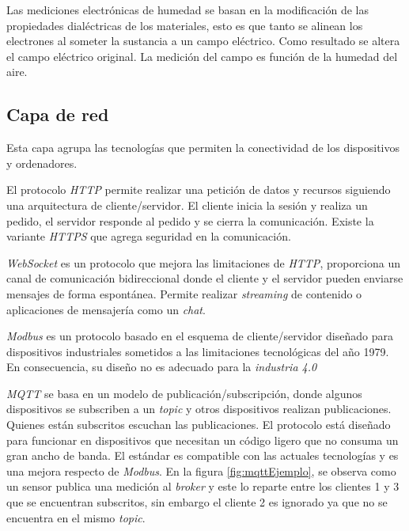			Las mediciones electrónicas de humedad se basan en la modificación de las propiedades dialéctricas de los materiales, esto es que tanto se alinean los electrones al someter la sustancia a un campo eléctrico. Como resultado se altera el campo eléctrico original. La medición del campo es función de la humedad del aire.
		
	\subsection{Capa de red}
	\label{capaRed}
	
		Esta capa agrupa las tecnologías que permiten la conectividad de los dispositivos y ordenadores.
		
		El protocolo \emph{HTTP} permite realizar una petición de datos y recursos siguiendo una arquitectura de cliente/servidor. El cliente inicia la sesión y realiza un pedido, el servidor responde al pedido y se cierra la comunicación. Existe la variante \emph{HTTPS} que agrega seguridad en la comunicación.
		
		\emph{WebSocket} es un protocolo que mejora las limitaciones de \emph{HTTP}, proporciona un canal de comunicación bidireccional donde el cliente y el servidor pueden enviarse mensajes de forma espontánea. Permite realizar \emph{streaming} de contenido o aplicaciones de mensajería como un \emph{chat}.
		
		\emph{Modbus} es un protocolo basado en el esquema de cliente/servidor diseñado para dispositivos industriales sometidos a las limitaciones tecnológicas del año 1979. En consecuencia, su diseño no es adecuado para la \emph{industria 4.0}
		
		\emph{MQTT} se basa en un modelo de publicación/subscripción, donde algunos dispositivos se subscriben a un \emph{topic} y otros dispositivos realizan publicaciones. Quienes están subscritos escuchan las publicaciones. El protocolo está diseñado para funcionar en dispositivos que necesitan un código ligero que no consuma un gran ancho de banda. El estándar es compatible con las actuales tecnologías y es una mejora respecto de \emph{Modbus}. En la figura \ref{fig:mqttEjemplo}, se observa como un sensor publica una medición al \emph{broker} y este lo reparte entre los clientes 1 y 3 que se encuentran subscritos, sin embargo el cliente 2 es ignorado ya que no se encuentra en el mismo \emph{topic}.
						
